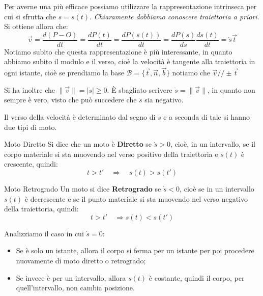 \documentclass[11pt,a4paper,twoside]{article}
\theoremstyle{definition}
\begin{document}
Per averne una più efficace possiamo utilizzare la rappresentazione intrinseca per cui si sfrutta che $s = s(t)$. \textit{Chiaramente dobbiamo conoscere traiettoria a priori}. Si ottiene allora che:
\[ \vec v = \frac{d(P-O)}{dt} = \frac{dP(t)}{dt} = \frac{dP(s(t))}{dt} = \frac{dP(s)}{ds} \frac{ds(t)}{dt} = \dot s \vec t \]
Notiamo subito che questa rappresentazione è più interessante, in quanto abbiamo subito il modulo e il verso, cioè la velocità è tangente alla traiettoria in ogni istante, cioè se prendiamo la base $\mathcal B = \{\vec t, \vec n, \vec b\}$ notiamo che $\vec v /\!/ \pm \vec t$

\begin{center}
\end{center}

Si ha inoltre che $\|\vec v\| = |\dot s|\geq 0$. È sbagliato scrivere $\dot s = \|\vec v\|$, in quanto non sempre è vero, visto che può succedere che $\dot s$ sia negativo.

Il verso della velocità è determinato dal segno di $\dot s$ e a seconda di tale si hanno due tipi di moto.

\begin{defn}{Moto Diretto}{}
	Si dice che un moto è \textbf{Diretto} se $\dot s>0$, cioè, in un intervallo, se il corpo materiale si sta muovendo nel verso positivo della traiettoria e $s(t)$ è crescente, quindi:
	\[t>t' \quad \Rightarrow \quad s(t)>s(t')\]
\end{defn}

\begin{defn}{Moto Retrogrado}{}
	Un moto si dice \textbf{Retrogrado} se $\dot s<0$, cioè se in un intervallo $s(t)$ è decrescente e se il punto materiale si sta muovendo nel verso negativo della traiettoria, quindi:
	\[t>t' \quad \Rightarrow s(t)<s(t')\]
\end{defn}

Analizziamo il caso in cui $\dot s = 0$:
\begin{itemize}
	\item Se è solo un istante, allora il corpo si ferma per un istante per poi procedere nuovamente di moto diretto o retrogrado;
	\item Se invece è per un intervallo, allora $s(t)$ è costante, quindi il corpo, per quell'intervallo, non cambia posizione.
\end{itemize}
\end{document}
